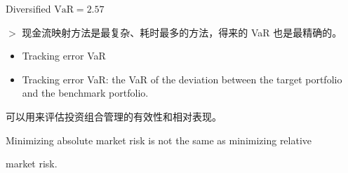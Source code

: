     Diversified \(\mathrm{{VaR}} = {2.57}\)
    
    \(>\) 现金流映射方法是最复杂、耗时最多的方法，得来的 VaR 也是最精确的。
    
    \begin{itemize}
    \item Tracking error VaR
    \end{itemize}
    
    \begin{itemize}
    \item Tracking error VaR: the VaR of the deviation between the target portfolio and the benchmark portfolio.
    \end{itemize}
    
     可以用来评估投资组合管理的有效性和相对表现。
    
    Minimizing absolute market risk is not the same as minimizing relative
    
    market risk.
    
